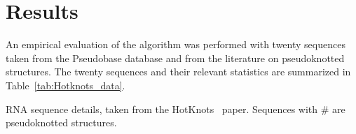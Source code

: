 \documentclass{doublecol-new}
\theoremstyle{TH}{
\newtheorem{lemma}{Lemma}
\newtheorem{theorem}[lemma]{Theorem}
\newtheorem{corrolary}[lemma]{Corrolary}
\newtheorem{conjecture}[lemma]{Conjecture}
\newtheorem{proposition}[lemma]{Proposition}
\newtheorem{claim}[lemma]{Claim}
\newtheorem{stheorem}[lemma]{Wrong Theorem}
\newtheorem{algorithm}{Algorithm}
}
\theoremstyle{THrm}{
\newtheorem{definition}{Definition}
\newtheorem{question}{Question}
\newtheorem{remark}{Remark}
\newtheorem{scheme}{Scheme}
}
\theoremstyle{THhit}{
\newtheorem{case}{Case}[section]
}
\begin{document}

\section{Results}
\label{results}
An empirical evaluation of the algorithm was performed with twenty sequences taken from the 
Pseudobase database
and from the literature on pseudoknotted structures.
The twenty sequences and their relevant statistics are summarized in
Table~\ref{tab:Hotknots_data}.

\begin{table}[h]
\scriptsize
\centering \caption{RNA sequence details, taken from the HotKnots~\cite{ren_2005} paper. Sequences with \# are
pseudoknotted structures.}\label{tab:Hotknots_data}


\end{table}
\end{document}
